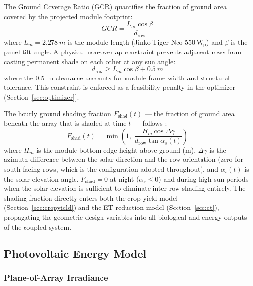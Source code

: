 The Ground Coverage Ratio (GCR) quantifies the fraction of ground
area covered by the projected module footprint:
\begin{equation}
    GCR = \frac{L_m \cos\beta}{d_{\text{row}}}
    \label{eq:gcr}
\end{equation}
where $L_m = \SI{2.278}{m}$ is the module length (Jinko Tiger Neo
550\,W$_{\text{p}}$) and $\beta$ is the panel tilt angle. A physical
non-overlap constraint prevents adjacent rows from casting permanent
shade on each other at any sun angle:
\begin{equation}
    d_{\text{row}} \geq L_m\cos\beta + \SI{0.5}{m}
    \label{eq:overlap}
\end{equation}
where the \SI{0.5}{m} clearance accounts for module frame width and
structural tolerance. This constraint is enforced as a feasibility
penalty in the optimizer (Section~\ref{sec:optimizer}).

The hourly ground shading fraction $F_{\text{shad}}(t)$ --- the
fraction of ground area beneath the array that is shaded at time $t$
--- follows \citet{zainali2023}:
\begin{equation}
    F_{\text{shad}}(t) = \min\!\left(1,\;
    \frac{H_m\cos\Delta\gamma}
         {d_{\text{row}}\tan\alpha_s(t)}\right)
    \label{eq:shading}
\end{equation}
where $H_m$ is the module bottom-edge height above ground (m),
$\Delta\gamma$ is the azimuth difference between the solar direction
and the row orientation (zero for south-facing rows, which is the
configuration adopted throughout), and $\alpha_s(t)$ is the solar
elevation angle. $F_{\text{shad}} = 0$ at night ($\alpha_s \leq 0$)
and during high-sun periods when the solar elevation is sufficient
to eliminate inter-row shading entirely. The shading fraction directly
enters both the crop yield model (Section~\ref{sec:cropyield}) and
the ET reduction model (Section~\ref{sec:et}), propagating the
geometric design variables into all biological and energy outputs
of the coupled system.

\subsection{Photovoltaic Energy Model}
\label{sec:pvmodel}

\subsubsection{Plane-of-Array Irradiance}

